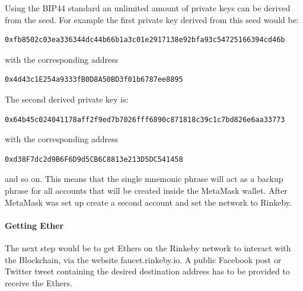 Using the BIP44\cite{bip44} standard an unlimited amount of private keys can be derived from the seed. For example the first private key derived from this seed would be:
\begin{lstlisting}[language=bash, numbers=none]
  0xfb8502c03ea336344dc44b66b1a3c01e2917138e92bfa93c54725166394cd46b
\end{lstlisting}
with the corresponding address
\begin{lstlisting}[language=bash, numbers=none]
  0x4d43c1E254a9333fB0D8A50BD3f01b6787ee8895
\end{lstlisting}
The second derived private key is:
\begin{lstlisting}[language=bash, numbers=none]
  0x64b45c024041178aff2f9ed7b7026fff6890c871818c39c1c7bd826e6aa33773
\end{lstlisting}
\newpage
with the corresponding address
\begin{lstlisting}[language=bash, numbers=none]
  0xd38F7dc2d9B6F6D9d5CB6C8813e213D5DC541458
\end{lstlisting}
and so on. This means that the single mnemonic phrase will act as a backup phrase for all accounts that will be created inside the MetaMask wallet.
After MetaMask was set up create a second account and set the network to Rinkeby.
\\
\paragraph{Getting Ether}
The next step would be to get Ethers on the Rinkeby network to interact with the Blockchain, via the website faucet.rinkeby.io. A public Facebook post or Twitter tweet containing the desired destination address has to be provided to receive the Ethers.
\\
